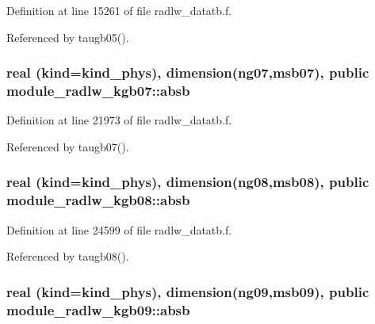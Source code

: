 Definition at line 15261 of file radlw\+\_\+datatb.\+f.



Referenced by taugb05().

\subsubsection[{\texorpdfstring{absb}{absb}}]{\setlength{\rightskip}{0pt plus 5cm}real (kind=kind\+\_\+phys), dimension(ng07,msb07), public module\+\_\+radlw\+\_\+kgb07\+::absb}\hypertarget{group__module__radlw__main_gab0478438e9bbe64401aa492510f8d4bb}{}\label{group__module__radlw__main_gab0478438e9bbe64401aa492510f8d4bb}


Definition at line 21973 of file radlw\+\_\+datatb.\+f.



Referenced by taugb07().

\subsubsection[{\texorpdfstring{absb}{absb}}]{\setlength{\rightskip}{0pt plus 5cm}real (kind=kind\+\_\+phys), dimension(ng08,msb08), public module\+\_\+radlw\+\_\+kgb08\+::absb}\hypertarget{group__module__radlw__main_ga23d4352fcafb0394d723e2f080a84ece}{}\label{group__module__radlw__main_ga23d4352fcafb0394d723e2f080a84ece}


Definition at line 24599 of file radlw\+\_\+datatb.\+f.



Referenced by taugb08().

\subsubsection[{\texorpdfstring{absb}{absb}}]{\setlength{\rightskip}{0pt plus 5cm}real (kind=kind\+\_\+phys), dimension(ng09,msb09), public module\+\_\+radlw\+\_\+kgb09\+::absb}\hypertarget{group__module__radlw__main_gadb2110a245d9f01b3fd1ab058c883003}{}\label{group__module__radlw__main_gadb2110a245d9f01b3fd1ab058c883003}


